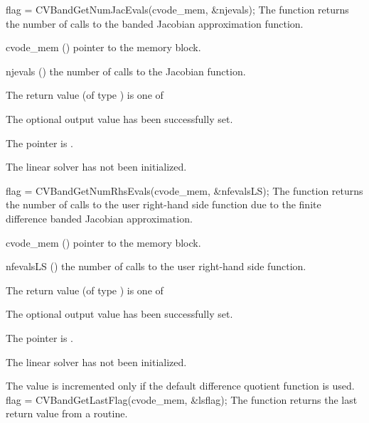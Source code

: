 {
  flag = CVBandGetNumJacEvals(cvode\_mem, \&njevals);
}
{
  The function  returns the
  number of calls to the banded Jacobian approximation function.
}
{
  \begin{args}
  \item[cvode\_mem] ()
    pointer to the {\cvode} memory block.
  \item[njevals] ()
    the number of calls to the Jacobian function.
  \end{args}
}
{
  The return value  (of type ) is one of
  \begin{args}
  \item[\Id{CVBAND\_SUCCESS}] 
    The optional output value has been successfully set.
  \item[\Id{CVBAND\_MEM\_NULL}]
    The  pointer is .
  \item[\Id{CVBAND\_LMEM\_NULL}]
    The {\cvband} linear solver has not been initialized.
  \end{args}
}
{}
{
  flag = CVBandGetNumRhsEvals(cvode\_mem, \&nfevalsLS);
}
{
  The function  returns the
  number of calls to the user right-hand side function due to the 
  finite difference banded Jacobian approximation.
}
{
  \begin{args}
  \item[cvode\_mem] ()
    pointer to the {\cvode} memory block.
  \item[nfevalsLS] ()
    the number of calls to the user right-hand side function.
  \end{args}
}
{
  The return value  (of type ) is one of
  \begin{args}
  \item[\Id{CVBAND\_SUCCESS}] 
    The optional output value has been successfully set.
  \item[\Id{CVBAND\_MEM\_NULL}]
    The  pointer is .
  \item[\Id{CVBAND\_LMEM\_NULL}]
    The {\cvband} linear solver has not been initialized.
  \end{args}
}
{
  The value  is incremented only if the default 
   difference quotient function is used.
}
{
  flag = CVBandGetLastFlag(cvode\_mem, \&lsflag);
}
{
  The function  returns the
  last return value from a {\cvband} routine. 
}
